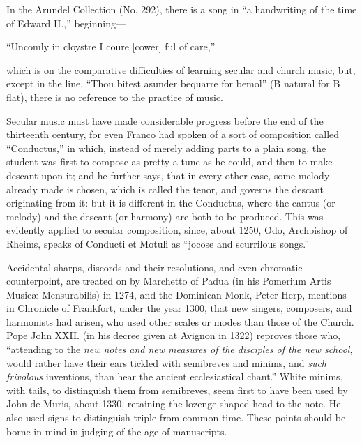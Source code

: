 

In the Arundel Collection (No. 292), there is a song in “a handwriting of
the time of Edward II.,” beginning—
\settowidth{\versewidth}{“Uncomly in cloystre I coure [cower] ful of care,”}
\begin{scverse}
“Uncomly in cloystre I coure [cower] ful of care,”
\end{scverse}
which is on the comparative difficulties of learning secular and church music,
but, except in the line, “Thou bitest asunder bequarre for bemol” (B natural
for B flat), there is no reference to the practice of music.

Secular music must have made considerable progress before the end of the
thirteenth century, for even Franco had spoken of a sort of composition called
“Conductus,” in which, instead of merely adding parts to a plain song, the student
was first to compose as pretty a tune as he could, and then to make descant
upon it; and he further says, that in every other case, some melody already made
is chosen, which is called the tenor, and governs the descant originating from it:
but it is different in the Conductus, where the cantus (or melody) and the descant
(or harmony) are both to be produced. This was evidently applied to secular
composition, since, about 1250, Odo, Archbishop of Rheims, speaks of Conducti et
Motuli as “jocose and scurrilous songs.”

Accidental sharps, discords and their resolutions, and even chromatic counterpoint,
are treated on by Marchetto of Padua (in his Pomerium Artis Musicæ
Mensurabilis) in 1274, and the Dominican Monk, Peter Herp, mentions in
Chronicle of Frankfort, under the year 1300, that new singers, composers, and
harmonists had arisen, who used other scales or modes than those of the Church.
Pope John XXII. (in his decree given at Avignon in 1322) reproves those who,
“attending to the \textit{new notes and new measures of the disciples of the new school},
would rather have their ears tickled with semibreves and minims, and \textit{such frivolous}
inventions, than hear the ancient ecclesiastical chant.” White minims, with tails,
to distinguish them from semibreves, seem first to have been used by John de
Muris, about 1330, retaining the lozenge-shaped head to the note. He also used
signs to distinguish triple from common time. These points should be borne in
mind in judging of the age of manuscripts.

